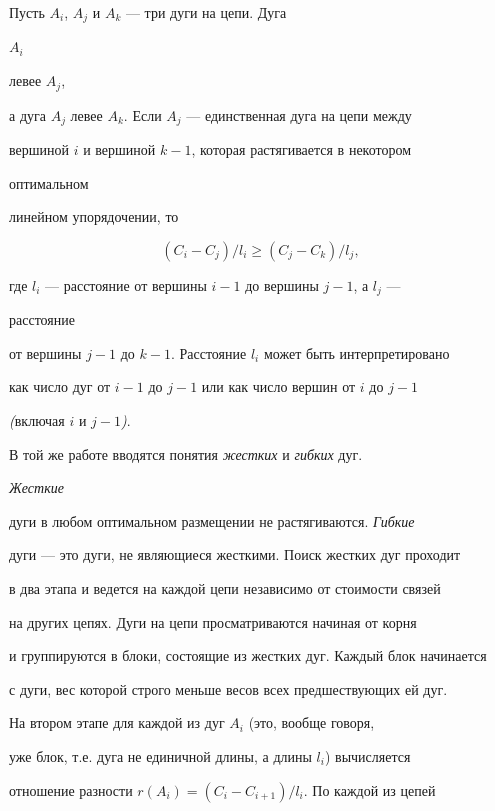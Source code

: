 \begin{lemnonum} Пусть $A_i$, $A_j$ и $A_k$ --- три дуги на цепи. Дуга


$A_i$


левее $A_j$,


а дуга $A_j$ левее $A_k$. Если $A_j$ --- единственная дуга на цепи между


вершиной $i$ и вершиной $k-1$, которая растягивается в некотором


оптимальном


линейном упорядочении, то


$$


(C_i-C_j)/l_i\ge (C_j-C_k)/l_j,


$$


где $l_i$ --- расстояние от вершины $i-1$ до вершины $j-1$, а $l_j$ ---


расстояние


от вершины $j-1$ до $k-1$. Расстояние $l_i$ может быть интерпретировано


как число дуг от $i-1$ до $j-1$ или как число вершин от $i$ до $j-1$


{\em (}включая $i$ и $j-1${\em )}.


\end{lemnonum}





В той же работе вводятся понятия {\em жестких} и {\em гибких} дуг.


{\em Жесткие}


дуги в любом оптимальном размещении не растягиваются. {\em Гибкие}


дуги --- это дуги, не являющиеся жесткими. Поиск жестких дуг проходит


в два этапа и ведется на каждой цепи независимо от стоимости связей


на других цепях. Дуги на цепи просматриваются начиная от корня


и группируются в блоки, состоящие из жестких дуг. Каждый блок начинается


с дуги, вес которой строго меньше весов всех предшествующих ей дуг.





На втором этапе для каждой из дуг $A_i$ (это, вообще говоря,


уже блок, т.е. дуга не единичной длины, а длины $l_i$) вычисляется


отношение разности $r(A_i)=(C_i-C_{i+1})/l_i$. По каждой из цепей


